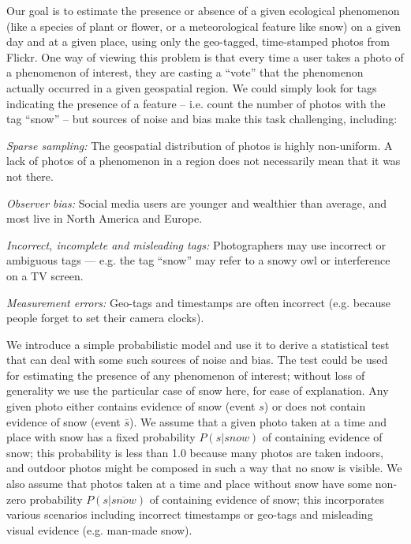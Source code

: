 Our goal is to estimate the presence or absence of a given ecological
phenomenon (like a species of plant or flower, or a meteorological
feature like snow) on a given day and at a given place,
using only the geo-tagged, time-stamped photos from Flickr. One way of viewing
this problem is that every time a user takes a photo of a phenomenon
of interest, they are casting a ``vote''  that the
phenomenon actually occurred in a given geospatial region. 
 We could
simply look for tags indicating the presence of a feature --
i.e. count the number of photos with the tag ``snow'' --  
but sources of noise and bias make this task 
challenging, including:
\begin{packed_itemize}
\item[---] \textit{Sparse sampling:} The geospatial distribution of photos
  is highly non-uniform. A lack of photos
  of a phenomenon in a region does not
  necessarily mean that it was not there. 
\item[---] \textit{Observer bias:} Social media users are younger and
  wealthier than average, and most live in North
  America and Europe.
\item[---] \textit{Incorrect, incomplete and misleading tags:}
  Photographers may use incorrect or ambiguous tags  ---
  e.g. the tag ``snow'' may refer to a snowy owl or interference on a
  TV screen.
\item[---] \textit{Measurement errors:} Geo-tags and timestamps are
  often incorrect (e.g. because people   forget to set their camera clocks).
\end{packed_itemize}

  We introduce a simple probabilistic model
and use it to derive a statistical test that can deal with some such
sources of noise and bias. The test could be used for estimating the
presence of any phenomenon of interest; without loss of generality we
use the particular case of snow here, for ease of explanation.  Any
given photo either contains evidence of snow (event $s$) or does not
contain evidence of snow (event $\bar{s}$).  We assume that a given
photo taken at a time and place with snow has a fixed probability $P(s
| snow)$ of containing evidence of snow; this probability is less than
1.0 because many photos are taken indoors, and outdoor photos might be
composed in such a way that no snow is visible. We also assume that
photos taken at a time and place without snow have some non-zero
probability $P(s | \overline{snow})$ of containing evidence of snow;
this incorporates various scenarios including incorrect timestamps or
geo-tags and misleading visual evidence (e.g.  man-made
snow).


